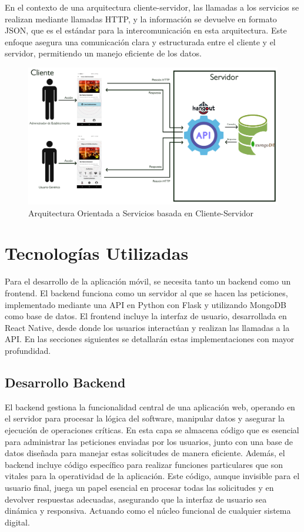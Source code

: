 En el contexto de una arquitectura cliente-servidor, las llamadas a los servicios se realizan mediante llamadas HTTP, y la información se devuelve en formato JSON, que es el estándar para la intercomunicación en esta arquitectura. Este enfoque asegura una comunicación clara y estructurada entre el cliente y el servidor, permitiendo un manejo eficiente de los datos.

\begin{figure}[H]
    \centering
    \includegraphics[width=\textwidth]{imagenes/ARQUITECTURA.jpg}
    \caption{Arquitectura Orientada a Servicios basada en Cliente-Servidor}
    \label{fig:ARQUITECTURA}
\end{figure}


\section{Tecnologías Utilizadas}

Para el desarrollo de la aplicación móvil, se necesita tanto un backend como un frontend. El backend funciona como un servidor al que se hacen las peticiones, implementado mediante una API en Python con Flask y utilizando MongoDB como base de datos. El frontend incluye la interfaz de usuario, desarrollada en React Native, desde donde los usuarios interactúan y realizan las llamadas a la API. En las secciones siguientes se detallarán estas implementaciones con mayor profundidad.

\subsection{Desarrollo Backend}

El backend gestiona la funcionalidad central de una aplicación web, operando en el servidor para procesar la lógica del software, manipular datos y asegurar la ejecución de operaciones críticas. En esta capa se almacena código que es esencial para administrar las peticiones enviadas por los usuarios, junto con una base de datos diseñada para manejar estas solicitudes de manera eficiente. Además, el backend incluye código específico para realizar funciones particulares que son vitales para la operatividad de la aplicación. Este código, aunque invisible para el usuario final, juega un papel esencial en procesar todas las solicitudes y en devolver respuestas adecuadas, asegurando que la interfaz de usuario sea dinámica y responsiva. Actuando como el núcleo funcional de cualquier sistema digital.

